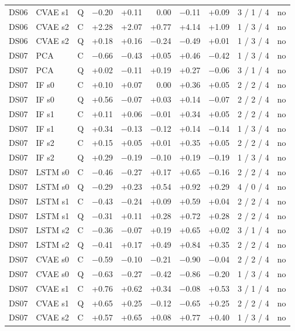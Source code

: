 \documentclass[10pt]{article}
\begin{document}
{\begin{longtable}{lllrrrrrcl}
DS06 & CVAE s1 & Q & −0.20 & +0.11 & 0.00 & −0.11 & +0.09 & 3 / 1 / 4 & no \\
DS06 & CVAE s2 & C & +2.28 & +2.07 & +0.77 & +4.14 & +1.09 & 1 / 3 / 4 & no \\
DS06 & CVAE s2 & Q & +0.18 & +0.16 & −0.24 & −0.49 & +0.01 & 1 / 3 / 4 & no \\
\midrule
DS07 & PCA & C & −0.66 & −0.43 & +0.05 & +0.46 & −0.42 & 1 / 3 / 4 & no \\
DS07 & PCA & Q & +0.02 & −0.11 & +0.19 & +0.27 & −0.06 & 3 / 1 / 4 & no \\
DS07 & IF s0 & C & +0.10 & +0.07 & 0.00 & +0.36 & +0.05 & 2 / 2 / 4 & no \\
DS07 & IF s0 & Q & +0.56 & −0.07 & +0.03 & +0.14 & −0.07 & 2 / 2 / 4 & no \\
DS07 & IF s1 & C & +0.11 & +0.06 & −0.01 & +0.34 & +0.05 & 2 / 2 / 4 & no \\
DS07 & IF s1 & Q & +0.34 & −0.13 & −0.12 & +0.14 & −0.14 & 1 / 3 / 4 & no \\
DS07 & IF s2 & C & +0.15 & +0.05 & +0.01 & +0.35 & +0.05 & 2 / 2 / 4 & no \\
DS07 & IF s2 & Q & +0.29 & −0.19 & −0.10 & +0.19 & −0.19 & 1 / 3 / 4 & no \\
DS07 & LSTM s0 & C & −0.46 & −0.27 & +0.17 & +0.65 & −0.16 & 2 / 2 / 4 & no \\
DS07 & LSTM s0 & Q & −0.29 & +0.23 & +0.54 & +0.92 & +0.29 & 4 / 0 / 4 & no \\
DS07 & LSTM s1 & C & −0.43 & −0.24 & +0.09 & +0.59 & +0.04 & 2 / 2 / 4 & no \\
DS07 & LSTM s1 & Q & −0.31 & +0.11 & +0.28 & +0.72 & +0.28 & 2 / 2 / 4 & no \\
DS07 & LSTM s2 & C & −0.36 & −0.07 & +0.19 & +0.65 & +0.02 & 3 / 1 / 4 & no \\
DS07 & LSTM s2 & Q & −0.41 & +0.17 & +0.49 & +0.84 & +0.35 & 2 / 2 / 4 & no \\
DS07 & CVAE s0 & C & −0.59 & −0.10 & −0.21 & −0.90 & −0.04 & 2 / 2 / 4 & no \\
DS07 & CVAE s0 & Q & −0.63 & −0.27 & −0.42 & −0.86 & −0.20 & 1 / 3 / 4 & no \\
DS07 & CVAE s1 & C & +0.76 & +0.62 & +0.34 & −0.08 & +0.53 & 3 / 1 / 4 & no \\
DS07 & CVAE s1 & Q & +0.65 & +0.25 & −0.12 & −0.65 & +0.25 & 2 / 2 / 4 & no \\
DS07 & CVAE s2 & C & +0.57 & +0.65 & +0.08 & +0.77 & +0.40 & 1 / 3 / 4 & no \\

\end{longtable}}
\end{document}
